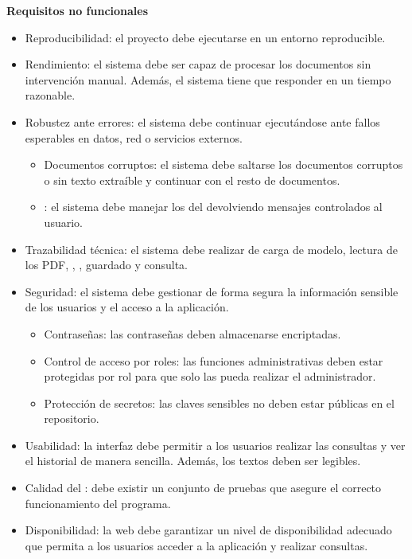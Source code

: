 \textbf{Requisitos no funcionales}
\begin{itemize}
\tightlist
	\item {} Reproducibilidad: el proyecto debe ejecutarse en un entorno reproducible.
	\item {} Rendimiento: el sistema debe ser capaz de procesar los documentos sin intervención manual. Además, el sistema tiene que responder en un tiempo razonable.
	\item {} Robustez ante errores: el sistema debe continuar ejecutándose ante fallos esperables en datos, red o servicios externos.
	\begin{itemize}
	\tightlist
		\item {} Documentos corruptos: el sistema debe saltarse los documentos corruptos o sin texto extraíble y continuar con el resto de documentos.
		\item {} : el sistema debe manejar los  del  devolviendo mensajes controlados al usuario.
	\end{itemize}
	\item {} Trazabilidad técnica: el sistema debe realizar  de carga de modelo, lectura de los PDF, , , guardado y consulta.
	\item {} Seguridad: el sistema debe gestionar de forma segura la información sensible de los usuarios y el acceso a la aplicación.
	\begin{itemize}
	\tightlist
		\item {} Contraseñas: las contraseñas deben almacenarse encriptadas.
		\item {} Control de acceso por roles: las funciones administrativas deben estar protegidas por rol para que solo las pueda realizar el administrador.
		\item {} Protección de secretos: las claves sensibles no deben estar públicas en el repositorio.
	\end{itemize}
	\item {} Usabilidad: la interfaz debe permitir a los usuarios realizar las consultas y ver el historial de manera sencilla. Además, los textos deben ser legibles.
	\item {} Calidad del : debe existir un conjunto de pruebas que asegure el correcto funcionamiento del programa. 
	\item {} Disponibilidad: la web debe garantizar un nivel de disponibilidad adecuado que permita a los usuarios acceder a la aplicación y realizar consultas.

\end{itemize}
